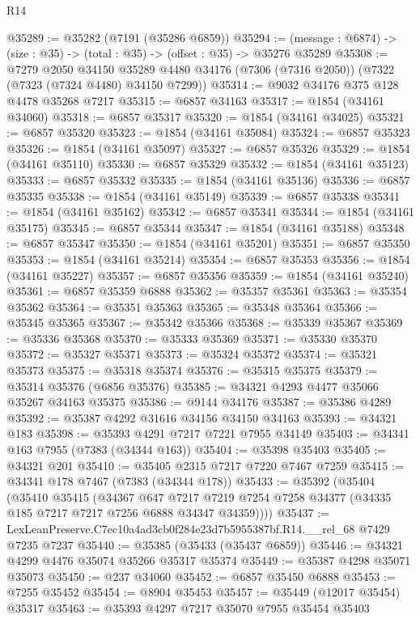 \begin{lexlean}{R14}
\begin{coremodule}
@35289 := @35282 (@7191 (@35286 @6859))
@35294 := (message : @6874) -> (size : @35) -> (total : @35) -> (offset : @35) -> @35276 @35289
@35308 := @7279
    @2050
    @34150
    @35289
    @4480
    @34176
    (@7306 (@7316 @2050))
    (@7322 (@7323 (@7324 @4480) @34150 @7299))
@35314 := @9032 @34176 @375 @128 @4478 @35268 @7217
@35315 := @6857 @34163
@35317 := @1854 (@34161 @34060)
@35318 := @6857 @35317
@35320 := @1854 (@34161 @34025)
@35321 := @6857 @35320
@35323 := @1854 (@34161 @35084)
@35324 := @6857 @35323
@35326 := @1854 (@34161 @35097)
@35327 := @6857 @35326
@35329 := @1854 (@34161 @35110)
@35330 := @6857 @35329
@35332 := @1854 (@34161 @35123)
@35333 := @6857 @35332
@35335 := @1854 (@34161 @35136)
@35336 := @6857 @35335
@35338 := @1854 (@34161 @35149)
@35339 := @6857 @35338
@35341 := @1854 (@34161 @35162)
@35342 := @6857 @35341
@35344 := @1854 (@34161 @35175)
@35345 := @6857 @35344
@35347 := @1854 (@34161 @35188)
@35348 := @6857 @35347
@35350 := @1854 (@34161 @35201)
@35351 := @6857 @35350
@35353 := @1854 (@34161 @35214)
@35354 := @6857 @35353
@35356 := @1854 (@34161 @35227)
@35357 := @6857 @35356
@35359 := @1854 (@34161 @35240)
@35361 := @6857 @35359 @6888
@35362 := @35357 @35361
@35363 := @35354 @35362
@35364 := @35351 @35363
@35365 := @35348 @35364
@35366 := @35345 @35365
@35367 := @35342 @35366
@35368 := @35339 @35367
@35369 := @35336 @35368
@35370 := @35333 @35369
@35371 := @35330 @35370
@35372 := @35327 @35371
@35373 := @35324 @35372
@35374 := @35321 @35373
@35375 := @35318 @35374
@35376 := @35315 @35375
@35379 := @35314 @35376 (@6856 @35376)
@35385 := @34321 @4293 @4477 @35066 @35267 @34163 @35375
@35386 := @9144 @34176
@35387 := @35386 @4289
@35392 := @35387 @4292 @31616 @34156 @34150 @34163
@35393 := @34321 @183
@35398 := @35393 @4291 @7217 @7221 @7955 @34149
@35403 := @34341 @163 @7955 (@7383 (@34344 @163))
@35404 := @35398 @35403
@35405 := @34321 @201
@35410 := @35405 @2315 @7217 @7220 @7467 @7259
@35415 := @34341 @178 @7467 (@7383 (@34344 @178))
@35433 := @35392
    (@35404
      (@35410
        @35415
        (@34367
          @647
          @7217
          @7219
          @7254
          @7258
          @34377
          (@34335 @185 @7217 @7217 @7256 @6888 @34347 @34359))))
@35437 := LexLeanPreserve.C7ec10a4ad3cb0f284e23d7b5955387bf.R14.__rel_68 @7429 @7235 @7237
@35440 := @35385 (@35433 (@35437 @6859))
@35446 := @34321 @4299 @4476 @35074 @35266 @35317 @35374
@35449 := @35387 @4298 @35071 @35073
@35450 := @237 @34060
@35452 := @6857 @35450 @6888
@35453 := @7255 @35452
@35454 := @8904 @35453
@35457 := @35449 (@12017 @35454) @35317
@35463 := @35393 @4297 @7217 @35070 @7955 @35454 @35403

\end{coremodule}
\end{lexlean}
